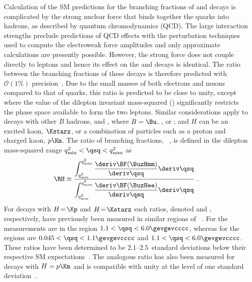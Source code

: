 Calculation of the SM predictions for the branching fractions of \BuKmm and \BuKee decays is complicated by the strong nuclear force that binds together the quarks into hadrons, as described by quantum chromodynamics (QCD). The large interaction strengths preclude predictions of QCD effects with the perturbation techniques used to compute the electroweak force amplitudes and only approximate  calculations are presently possible. However, the strong force does not  couple directly to leptons and hence its effect on the \BuKmm and \BuKee decays is identical. The ratio between the branching fractions of these decays is therefore predicted with $\mathcal{O}(1\%)$ precision~\cite{Descotes-Genon:2015uva,Bobeth:2007,Bordone:2016gaq,EOS,Straub:2018kue,Isidori:2020acz}. 
Due to the small masses of both electrons and muons compared to that of \bquark quarks, this ratio is predicted to be close to unity, 
except where the value of the dilepton invariant mass-squared (\qsq) significantly restricts the phase space available to form the two leptons.
Similar considerations apply to decays with other $B$ hadrons, \BuzHmm and \BuzHee, where $B=\Bu$, \Bz, \Bs or \Lb; and $H$ can be \eg an excited kaon, $\Kstarz$, or a combination of particles such as a proton and charged kaon, $p\Km$. 
The ratio of branching fractions, \RH~\cite{Hiller:2003js, Wang:2003je}, is defined in the dilepton mass-squared range $q^{2}_{\rm min} < \qsq < q^{2}_{\rm max}$ as
\begin{equation}
\label{eq:rh}
\RH \equiv  \dfrac{\displaystyle\int_{q^2_\mathrm{min}}^{q^2_{\rm max}} \dfrac{\deriv\BF(\BuzHmm)}{\deriv\qsq} \deriv\qsq}{\displaystyle\int_{q^2_{\rm min}}^{q^2_{\rm max}} \dfrac{\deriv\BF(\BuzHee)}{\deriv\qsq} \deriv\qsq} ~.
\end{equation}
\noindent 
For decays with $H\!=\!\Kp$ and $H\!=\!\Kstarz$ such ratios, denoted \RK and \RKstar, respectively, have previously been measured in similar regions of \qsq~\cite{LHCb-PAPER-2019-009, LHCb-PAPER-2017-013}.
For \RK the measurements are in the region $1.1 < \qsq < 6.0 \gevgevcccc$, whereas for \RKstar the regions are \mbox{$0.045 < \qsq < 1.1 \gevgevcccc$} and $1.1 < \qsq < 6.0 \gevgevcccc$. These ratios have been determined to be 
$2.1$--$2.5$~standard deviations below their respective SM expectations~\cite{Descotes-Genon:2015uva,Bobeth:2007,Bordone:2016gaq,Capdevila:2016ivx,Capdevila:2017ert,Serra:2016ivr,EOS,Straub:2015ica,Straub:2018kue,Altmannshofer:2017fio,Jager:2014rwa}. 
The analogous ratio has also been measured for \Lb decays with $H=p\Km$ and is compatible with unity at the level of one standard deviation~\cite{LHCb-PAPER-2019-040}.

